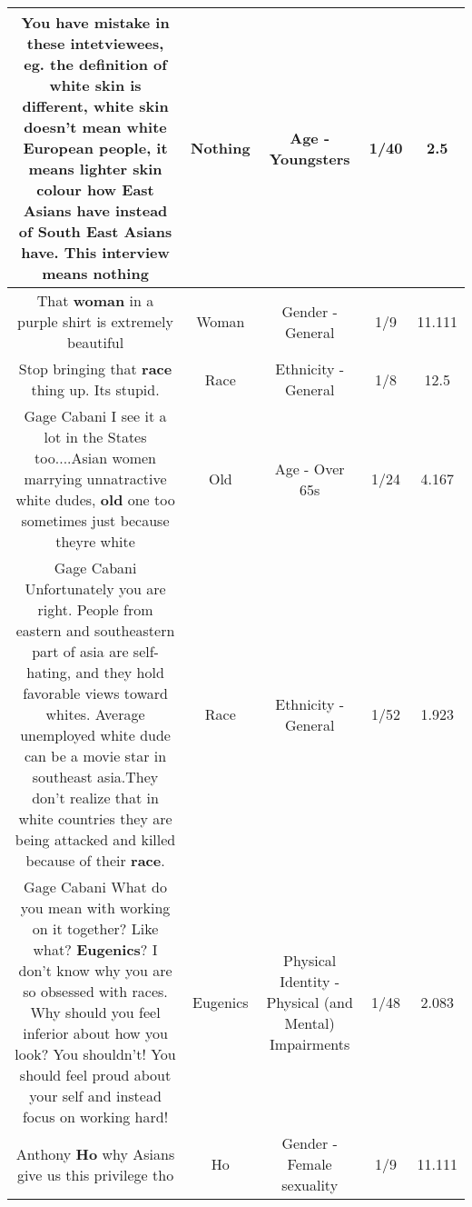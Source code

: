 \documentclass[11pt]{article}
\newlength\mylength
\begin{document}
\begin{center}
\begin{longtable}{|C{.65\mylength}|C{.30\mylength}|C{.12\mylength}|C{.12\mylength}|C{.12\mylength}|}
  \small You have mistake in these intetviewees, eg. the definition of white skin is different, white skin doesn't mean white European people, it means lighter skin colour how East Asians have instead of South East Asians have. This interview means nothing\normalsize   & Nothing & Age - Youngsters & 1/40 & 2.5 \\  \hline
  \small That \textbf{woman} in a purple shirt is extremely beautiful\normalsize   & Woman & Gender - General & 1/9 & 11.111 \\  \hline
  \small Stop bringing that \textbf{race} thing up. Its stupid.\normalsize   & Race & Ethnicity - General & 1/8 & 12.5 \\  \hline
  \small Gage Cabani I see it a lot in the States too....Asian women marrying unnatractive white dudes, \textbf{old} one too sometimes just because theyre white\normalsize   & Old & Age - Over 65s & 1/24 & 4.167 \\  \hline
  \small Gage Cabani Unfortunately you are right. People from eastern and southeastern part of asia are self-hating, and they hold favorable views toward whites. Average unemployed white dude can be a movie star in southeast asia.They don't realize that in white countries they are being attacked and killed because of their \textbf{race}.\normalsize   & Race & Ethnicity - General & 1/52 & 1.923 \\  \hline
  \small Gage Cabani What do you mean with working on it together? Like what? \textbf{Eugenics}? I don't know why you are so obsessed with races. Why should you feel inferior about how you look? You shouldn't! You should feel proud about your self and instead focus on working hard!\normalsize   & Eugenics & Physical Identity - Physical (and Mental) Impairments & 1/48 & 2.083 \\  \hline
  \small Anthony \textbf{Ho} why Asians give us this privilege tho\normalsize   & Ho & Gender - Female sexuality & 1/9 & 11.111 \\  \hline

\end{longtable}
\end{center}
\end{document}
